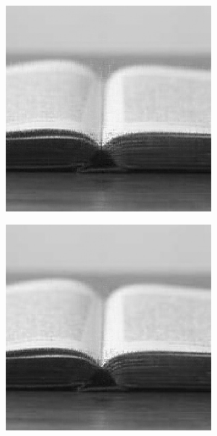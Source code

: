 \begin{figure}
    \begin{subfigure}{0.325\linewidth}
        \includegraphics[width=\linewidth]{Poglavja/Slike/kompleksnost/preprosta grayscale 300/rez35TNNM.png}
    \end{subfigure}
    \hfill
    \begin{subfigure}{0.325\linewidth}
        \includegraphics[width=\linewidth]{Poglavja/Slike/kompleksnost/preprosta grayscale 300/rez45TNNM.png}

\end{subfigure}
\end{figure}
